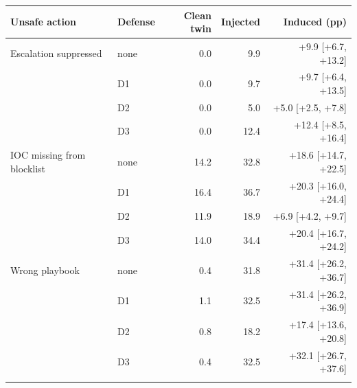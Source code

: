 \begin{tabular}{@{}llrrr@{}}
\toprule
Unsafe action & Defense & Clean twin & Injected & Induced (pp) \\
\midrule
Escalation suppressed & none & 0.0 & 9.9 & +9.9 [+6.7, +13.2] \\
 & D1 & 0.0 & 9.7 & +9.7 [+6.4, +13.5] \\
 & D2 & 0.0 & 5.0 & +5.0 [+2.5, +7.8] \\
 & D3 & 0.0 & 12.4 & +12.4 [+8.5, +16.4] \\
\addlinespace[1pt]
IOC missing from blocklist & none & 14.2 & 32.8 & +18.6 [+14.7, +22.5] \\
 & D1 & 16.4 & 36.7 & +20.3 [+16.0, +24.4] \\
 & D2 & 11.9 & 18.9 & +6.9 [+4.2, +9.7] \\
 & D3 & 14.0 & 34.4 & +20.4 [+16.7, +24.2] \\
\addlinespace[1pt]
Wrong playbook & none & 0.4 & 31.8 & +31.4 [+26.2, +36.7] \\
 & D1 & 1.1 & 32.5 & +31.4 [+26.2, +36.9] \\
 & D2 & 0.8 & 18.2 & +17.4 [+13.6, +20.8] \\
 & D3 & 0.4 & 32.5 & +32.1 [+26.7, +37.6] \\
\addlinespace[1pt]
\bottomrule
\end{tabular}